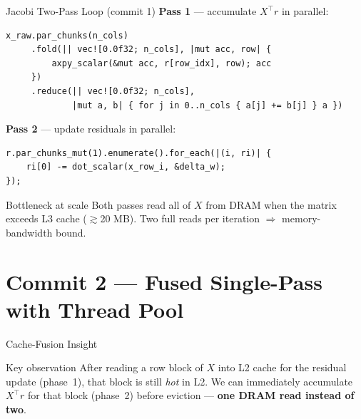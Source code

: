 \documentclass[aspectratio=169]{beamer}
\begin{document}
\begin{frame}[fragile]{Jacobi Two-Pass Loop (commit 1)}
  \textbf{Pass 1} — accumulate $X^\top r$ in parallel:
\begin{lstlisting}
x_raw.par_chunks(n_cols)
     .fold(|| vec![0.0f32; n_cols], |mut acc, row| {
         axpy_scalar(&mut acc, r[row_idx], row); acc
     })
     .reduce(|| vec![0.0f32; n_cols],
             |mut a, b| { for j in 0..n_cols { a[j] += b[j] } a })
\end{lstlisting}

  \textbf{Pass 2} — update residuals in parallel:
\begin{lstlisting}
r.par_chunks_mut(1).enumerate().for_each(|(i, ri)| {
    ri[0] -= dot_scalar(x_row_i, &delta_w);
});
\end{lstlisting}

  \begin{alertblock}{Bottleneck at scale}
    Both passes read all of $X$ from DRAM when the matrix exceeds L3 cache
    ($\gtrsim$20 MB). Two full reads per iteration $\Rightarrow$ memory-bandwidth bound.
  \end{alertblock}
\end{frame}

\section{Commit 2 — Fused Single-Pass with Thread Pool}

\begin{frame}{Cache-Fusion Insight}
  \begin{block}{Key observation}
    After reading a row block of $X$ into L2 cache for the residual update
    (phase~1), that block is still \emph{hot} in L2.  We can immediately
    accumulate $X^\top r$ for that block (phase~2) before eviction —
    \textbf{one DRAM read instead of two}.
  \end{block}
  \vspace{0.4em}
  \begin{center}
  \end{center}
\end{frame}
\end{document}
